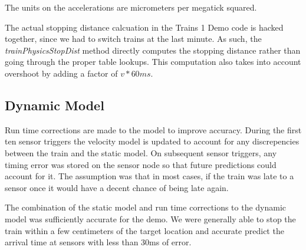 \documentclass[twoside,a4paper]{refart}
\begin{document}
The units on the accelerations are micrometers per megatick squared.

The actual stopping distance calcuation in the Trains 1 Demo code is hacked together, since we had to switch trains at the last minute. As such, the \textit{trainPhysicsStopDist} method directly computes the stopping distance rather than going through the proper table lookups. This computation also takes into account overshoot by adding a factor of $v*60ms$.

\subsection{Dynamic Model}

Run time corrections are made to the model to improve accuracy. During the first ten sensor triggers the velocity model is updated to account for any discrepencies between the train and the static model. On subsequent sensor triggers, any timing error was stored on the sensor node so that future predictions could account for it. The assumption was that in most cases, if the train was late to a sensor once it would have a decent chance of being late again.

The combination of the static model and run time corrections to the dynamic model was sufficiently accurate for the demo. We were generally able to stop the train within a few centimeters of the target location and accurate predict the arrival time at sensors with less than 30ms of error.
\end{document}
